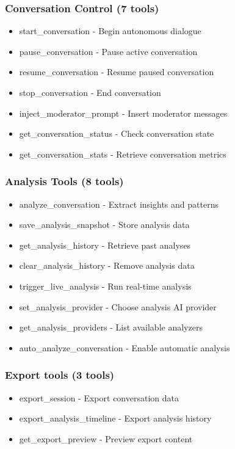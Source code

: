 \documentclass[11pt,letterpaper]{article}
\begin{document}
\subsubsection{Conversation Control (7 tools)}
\begin{itemize}
    \item start\_conversation - Begin autonomous dialogue
    \item pause\_conversation - Pause active conversation
    \item resume\_conversation - Resume paused conversation
    \item stop\_conversation - End conversation
    \item inject\_moderator\_prompt - Insert moderator messages
    \item get\_conversation\_status - Check conversation state
    \item get\_conversation\_stats - Retrieve conversation metrics
\end{itemize}

\subsubsection{Analysis Tools (8 tools)}
\begin{itemize}
    \item analyze\_conversation - Extract insights and patterns
    \item save\_analysis\_snapshot - Store analysis data
    \item get\_analysis\_history - Retrieve past analyses
    \item clear\_analysis\_history - Remove analysis data
    \item trigger\_live\_analysis - Run real-time analysis
    \item set\_analysis\_provider - Choose analysis AI provider
    \item get\_analysis\_providers - List available analyzers
    \item auto\_analyze\_conversation - Enable automatic analysis
\end{itemize}

\subsubsection{Export tools (3 tools)}
\begin{itemize}
    \item export\_session - Export conversation data
    \item export\_analysis\_timeline - Export analysis history
    \item get\_export\_preview - Preview export content
\end{itemize}
\end{document}
